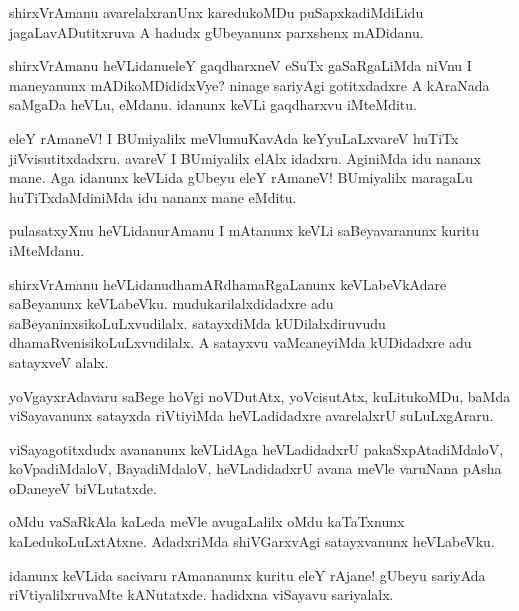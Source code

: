 \begin{mng}
shirxVrAmanu avarelalxranUnx karedukoMDu puSapxkadiMdiLidu jagaLavADutitxruva A hadudx gUbeyanunx parxshenx mADidanu.
\end{mng}

\begin{mng}
shirxVrAmanu heVLidanu\mdash eleY gaqdharxneV eSuTx gaSaRgaLiMda niVnu I maneyanunx mADikoMDididxVye? ninage sariyAgi gotitxdadxre A kAraNada saMgaDa heVLu, eMdanu. idanunx keVLi gaqdharxvu iMteMditu.
\end{mng}

\begin{mng}
eleY rAmaneV! I BUmiyalilx meVlumuKavAda keYyuLaLxvareV huTiTx jiVvisutitxdadxru. avareV I BUmiyalilx elAlx idadxru. AginiMda idu nananx mane. Aga idanunx keVLida gUbeyu eleY rAmaneV! BUmiyalilx maragaLu huTiTxdaMdiniMda idu nananx mane eMditu.
\end{mng}

\begin{mng}
pulasatxyXnu heVLidanu\mdash rAmanu I mAtanunx keVLi saBeyavaranunx kuritu iMteMdanu.
\end{mng}

\begin{mng}
shirxVrAmanu heVLidanu\mdash dhamARdhamaRgaLanunx keVLabeVkAdare saBeyanunx keVLabeVku. mudukarilalxdidadxre adu saBeyaninxsikoLuLxvudilalx. satayxdiMda kUDilalxdiruvudu dhamaRvenisikoLuLxvudilalx. A satayxvu vaMcaneyiMda kUDidadxre adu satayxveV alalx.
\end{mng}

\begin{mng}
yoVgayxrAdavaru saBege hoVgi noVDutAtx, yoVcisutAtx, kuLitukoMDu, baMda viSayavanunx satayxda riVtiyiMda heVLadidadxre avarelalxrU suLuLxgAraru.
\end{mng}

\begin{mng}
viSayagotitxdudx avananunx keVLidAga heVLadidadxrU pakaSxpAtadiMdaloV, koVpadiMdaloV, BayadiMdaloV, heVLadidadxrU avana meVle varuNana pAsha oDaneyeV biVLutatxde.
\end{mng}

\begin{mng}
oMdu vaSaRkAla kaLeda meVle avugaLalilx oMdu kaTaTxnunx kaLedukoLuLxtAtxne. AdadxriMda shiVGarxvAgi satayxvanunx heVLabeVku.
\end{mng}

\begin{mng}
idanunx keVLida sacivaru rAmananunx kuritu eleY rAjane! gUbeyu sariyAda riVtiyalilxruvaMte kANutatxde. hadidxna viSayavu sariyalalx.
\end{mng}

